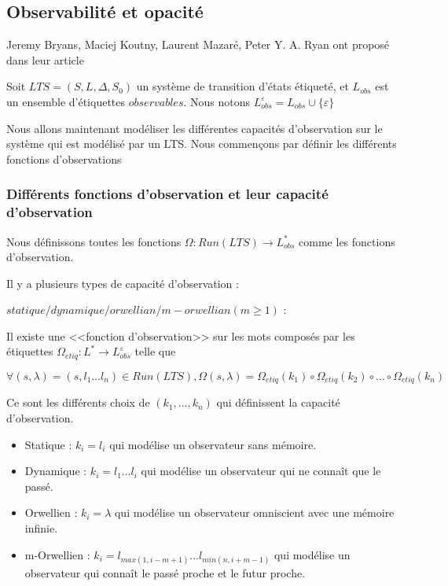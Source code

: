 \documentclass[10pt,a4paper]{article}
\begin{document}
\subsection{Observabilit\'e et opacit\'e}

Jeremy Bryans, Maciej Koutny, Laurent Mazar{\'{e}}, Peter Y. A. Ryan ont propos\'e dans leur article ~\cite{BryansKMR08}

Soit $LTS=(S,L,\Delta,S_0)$ un syst\`eme de transition d'\'etats étiqueté, et $L_{obs}$ est un ensemble d'étiquettes $observables$. Nous notons $L_{obs}^{\varepsilon} = L_{obs} \cup \{\varepsilon\}$

Nous allons maintenant mod\'eliser les diff\'erentes capacit\'es d'observation sur le syst\`eme qui est mod\'elis\'e par un LTS. Nous commen\c cons par d\'efinir les diff\'erents fonctions d'observations

\subsubsection{Diff\'erents fonctions d'observation et leur capacit\'e d'observation}

Nous d\'efinissons toutes les fonctions $\Omega : Run(LTS) \rightarrow L_{obs}^*$ comme les fonctions   
 d'observation.
 
Il y a plusieurs types de capacit\'e d'observation : 


$statique/dynamique/orwellian/m-orwellian(m\geq 1)$ :
		
Il existe une <<fonction d'observation>> sur les mots compos\'es par les \'etiquettes $\Omega_{etiq} : L^* \rightarrow L_{obs}^{\varepsilon}$ telle que 
	
	$$\forall (s,\lambda)= (s,l_1\dots l_n) \in Run(LTS), \Omega(s,\lambda) = \Omega_{etiq}(k_1)\circ\Omega_{etiq}(k_2)\circ\dots\circ\Omega_{etiq}(k_n)$$
	
	Ce sont les diff\'erents choix de $(k_1,\dots, k_n)$ qui d\'efinissent la capacit\'e d'observation.


\begin{itemize}
        \item Statique : $k_i = l_i$ qui modélise un observateur sans mémoire.
	\item Dynamique : $k_i = l_1 \dots l_i$ qui modélise un observateur qui ne connaît que le passé.
	\item Orwellien : $k_i = \lambda$ qui modélise un observateur omniscient avec une mémoire infinie.
	\item m-Orwellien : $k_i = l_{max(1,i-m+1)} \dots l_{min(n,i+m-1)}$ qui modélise un observateur qui connaît le passé proche et le futur proche.

\end{itemize}
\end{document}
